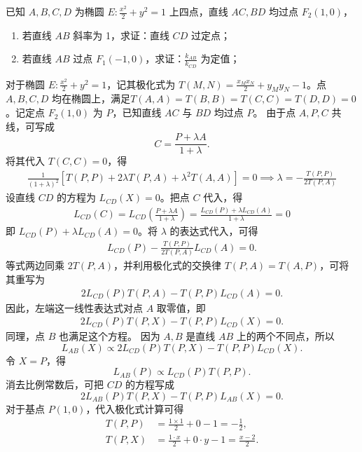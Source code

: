 \begin{exercise}
已知 \(A,B,C,D\) 为椭圆 \(E: \frac{x^2}{2} + y^2 = 1\) 上四点，直线 \(AC, BD\) 均过点 \(F_2(1,0)\)，
\begin{enumerate}
\item 若直线 \(AB\) 斜率为 1，求证：直线 \(CD\) 过定点；
\item 若直线 \(AB\) 过点 \(F_1(-1,0)\)，求证：\(\frac{k_{AB}}{k_{CD}}\) 为定值；
\end{enumerate}
\end{exercise}
\begin{solution}
对于椭圆 $E: \frac{x^2}{2} + y^2 = 1$，记其极化式为 $T(M, N) = \frac{x_M x_N}{2} + y_M y_N - 1$。点 $A, B, C, D$ 均在椭圆上，满足$T(A,A) = T(B,B) = T(C,C) = T(D,D) = 0$。记定点 $F_2(1,0)$ 为 $P$，已知直线 $AC$ 与 $BD$ 均过点 $P$。
由于点 $A, P, C$ 共线，可写成
\[
C = \frac{P + \lambda A}{1+\lambda}.
\]
将其代入 $T(C,C) = 0$，得
\begin{align*}
\frac{1}{(1+\lambda)^2} \left[ T(P,P) + 2\lambda T(P,A) + \lambda^2 T(A,A) \right] = 0\implies \lambda = -\frac{T(P,P)}{2T(P,A)}
\end{align*}
设直线 $CD$ 的方程为 $L_{CD}(X) = 0$。把点 $C$ 代入，得
\begin{align*}
L_{CD}(C) = L_{CD}\left(\frac{P + \lambda A}{1+\lambda}\right) = \frac{L_{CD}(P) + \lambda L_{CD}(A)}{1+\lambda} = 0
\end{align*}
即 $L_{CD}(P) + \lambda L_{CD}(A) = 0$。将 $\lambda$ 的表达式代入，可得
\begin{align*}
L_{CD}(P) - \frac{T(P,P)}{2T(P,A)} L_{CD}(A) = 0.
\end{align*}
等式两边同乘 $2T(P,A)$，并利用极化式的交换律 $T(P,A) = T(A,P)$，可将其重写为
\begin{align*}
2L_{CD}(P)T(P,A) - T(P,P)L_{CD}(A) = 0.
\end{align*}
    因此，左端这一线性表达式对点 $A$ 取零值，即
    \begin{align*}
    2L_{CD}(P)T(P,X) - T(P,P)L_{CD}(X) = 0.
    \end{align*}
    同理，点 $B$ 也满足这个方程。
因为 $A,B$ 是直线 $AB$ 上的两个不同点，所以
\[
L_{AB}(X) \propto 2L_{CD}(P)T(P,X) - T(P,P)L_{CD}(X).
\]
令 $X=P$，得
\[
L_{AB}(P) \propto L_{CD}(P)T(P,P).
\]
消去比例常数后，可把 $CD$ 的方程写成
\[
2L_{AB}(P) T(P,X) - T(P,P) L_{AB}(X) = 0.
\]
对于基点 $P(1,0)$，代入极化式计算可得
\begin{align*}
T(P,P) &= \frac{1 \times 1}{2} + 0 - 1 = -\frac{1}{2}, \\
T(P,X) &= \frac{1 \cdot x}{2} + 0 \cdot y - 1 = \frac{x-2}{2}.

\end{align*}
\end{solution}
